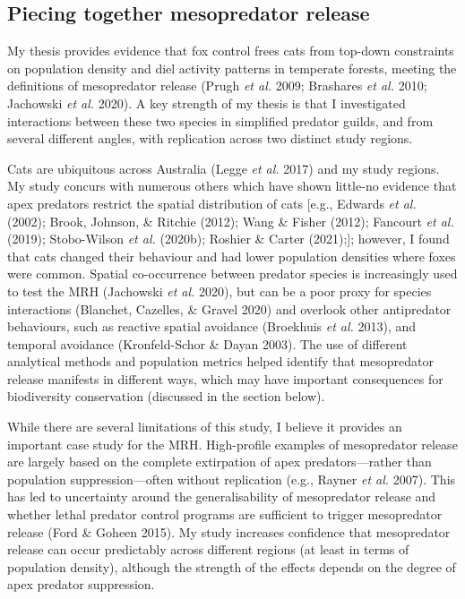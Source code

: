 \documentclass[11pt,a4paper,titlepage,twoside,openright]{style/unimelbthesis}
\begin{document}
\begin{mainmatter}
\hypertarget{piecing-together-mesopredator-release}{%
\section{Piecing together mesopredator release}\label{piecing-together-mesopredator-release}}

My thesis provides evidence that fox control frees cats from top-down constraints on population density and diel activity patterns in temperate forests, meeting the definitions of mesopredator release (Prugh \emph{et al.} 2009; Brashares \emph{et al.} 2010; Jachowski \emph{et al.} 2020). A key strength of my thesis is that I investigated interactions between these two species in simplified predator guilds, and from several different angles, with replication across two distinct study regions.

Cats are ubiquitous across Australia (Legge \emph{et al.} 2017) and my study regions. My study concurs with numerous others which have shown little-no evidence that apex predators restrict the spatial distribution of cats {[}e.g., Edwards \emph{et al.} (2002); Brook, Johnson, \& Ritchie (2012); Wang \& Fisher (2012); Fancourt \emph{et al.} (2019); Stobo-Wilson \emph{et al.} (2020b); Roshier \& Carter (2021);{]}; however, I found that cats changed their behaviour and had lower population densities where foxes were common. Spatial co-occurrence between predator species is increasingly used to test the MRH (Jachowski \emph{et al.} 2020), but can be a poor proxy for species interactions (Blanchet, Cazelles, \& Gravel 2020) and overlook other antipredator behaviours, such as reactive spatial avoidance (Broekhuis \emph{et al.} 2013), and temporal avoidance (Kronfeld-Schor \& Dayan 2003). The use of different analytical methods and population metrics helped identify that mesopredator release manifests in different ways, which may have important consequences for biodiversity conservation (discussed in the section below).

While there are several limitations of this study, I believe it provides an important case study for the MRH. High-profile examples of mesopredator release are largely based on the complete extirpation of apex predators---rather than population suppression---often without replication (e.g., Rayner \emph{et al.} 2007). This has led to uncertainty around the generalisability of mesopredator release and whether lethal predator control programs are sufficient to trigger mesopredator release (Ford \& Goheen 2015). My study increases confidence that mesopredator release can occur predictably across different regions (at least in terms of population density), although the strength of the effects depends on the degree of apex predator suppression.


\end{mainmatter}
\end{document}
